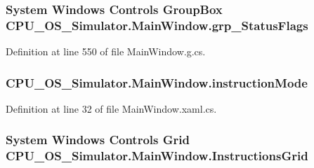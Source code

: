 \subsubsection[{grp\+\_\+\+Status\+Flags}]{\setlength{\rightskip}{0pt plus 5cm}System Windows Controls Group\+Box C\+P\+U\+\_\+\+O\+S\+\_\+\+Simulator.\+Main\+Window.\+grp\+\_\+\+Status\+Flags\hspace{0.3cm}{\ttfamily [package]}}\label{class_c_p_u___o_s___simulator_1_1_main_window_a9947d1946c8258ea1fb77d860baa7e0f}


Definition at line 550 of file Main\+Window.\+g.\+cs.

\hypertarget{class_c_p_u___o_s___simulator_1_1_main_window_adcf36837be53f52843bbeb354a16d15c}{}
\subsubsection[{instruction\+Mode}]{ C\+P\+U\+\_\+\+O\+S\+\_\+\+Simulator.\+Main\+Window.\+instruction\+Mode\hspace{0.3cm}{\ttfamily [private]}}\label{class_c_p_u___o_s___simulator_1_1_main_window_adcf36837be53f52843bbeb354a16d15c}


Definition at line 32 of file Main\+Window.\+xaml.\+cs.

\hypertarget{class_c_p_u___o_s___simulator_1_1_main_window_a2e6841673af413e8a8f8ba8aa0d7c80b}{}
\subsubsection[{Instructions\+Grid}]{\setlength{\rightskip}{0pt plus 5cm}System Windows Controls Grid C\+P\+U\+\_\+\+O\+S\+\_\+\+Simulator.\+Main\+Window.\+Instructions\+Grid\hspace{0.3cm}{\ttfamily [package]}}\label{class_c_p_u___o_s___simulator_1_1_main_window_a2e6841673af413e8a8f8ba8aa0d7c80b}


